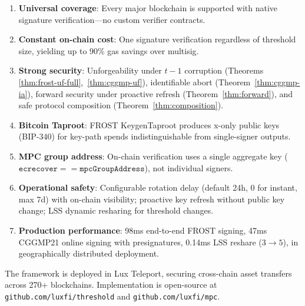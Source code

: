 \documentclass[11pt,twocolumn]{article}
\begin{document}
\begin{enumerate}[nosep]
  \item \textbf{Universal coverage}: Every major blockchain is supported with native
    signature verification---no custom verifier contracts.
  \item \textbf{Constant on-chain cost}: One signature verification regardless of
    threshold size, yielding up to 90\% gas savings over multisig.
  \item \textbf{Strong security}: Unforgeability under $t{-}1$ corruption (Theorems
    \ref{thm:frost-uf-full},~\ref{thm:cggmp-uf}), identifiable abort
    (Theorem~\ref{thm:cggmp-ia}), forward security under proactive refresh
    (Theorem~\ref{thm:forward}), and safe protocol composition
    (Theorem~\ref{thm:composition}).
  \item \textbf{Bitcoin Taproot}: FROST KeygenTaproot produces x-only public keys
    (BIP-340) for key-path spends indistinguishable from single-signer outputs.
  \item \textbf{MPC group address}: On-chain verification uses a single aggregate
    key ($\texttt{ecrecover} == \texttt{mpcGroupAddress}$), not individual signers.
  \item \textbf{Operational safety}: Configurable rotation delay (default 24h, 0 for
    instant, max 7d) with on-chain visibility; proactive key refresh without public
    key change; LSS dynamic resharing for threshold changes.
  \item \textbf{Production performance}: 98ms end-to-end FROST signing, 47ms CGGMP21
    online signing with presignatures, 0.14ms LSS reshare ($3 \to 5$), in
    geographically distributed deployment.
\end{enumerate}

The framework is deployed in Lux Teleport, securing cross-chain asset transfers across
270+ blockchains. Implementation is open-source at \texttt{github.com/luxfi/threshold}
and \texttt{github.com/luxfi/mpc}.
\end{document}
